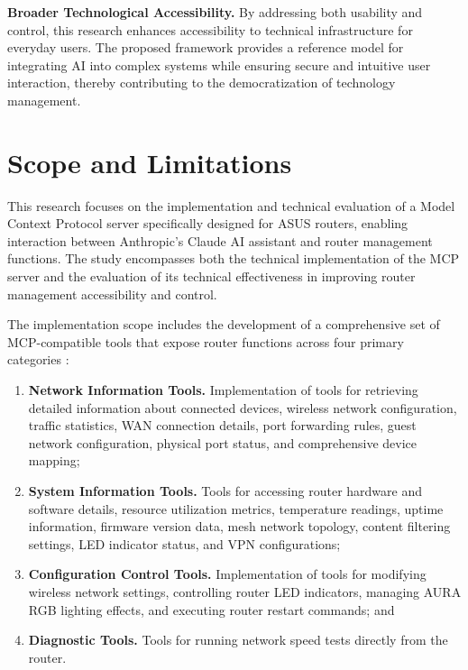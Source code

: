 \textbf{Broader Technological Accessibility.} By addressing both usability and control, this research enhances accessibility to technical infrastructure for everyday users. The proposed framework provides a reference model for integrating AI into complex systems while ensuring secure and intuitive user interaction, thereby contributing to the democratization of technology management.

\section{Scope and Limitations}
This research focuses on the implementation and technical evaluation of a Model Context Protocol server specifically designed for ASUS routers, enabling interaction between Anthropic's Claude AI assistant and router management functions. The study encompasses both the technical implementation of the MCP server and the evaluation of its technical effectiveness in improving router management accessibility and control. 

The implementation scope includes the development of a comprehensive set of MCP-compatible tools that expose router functions across four primary categories \cite{mcp_intro}:

\begin{enumerate}
\item \textbf{Network Information Tools.} Implementation of tools for retrieving detailed information about connected devices, wireless network configuration, traffic statistics, WAN connection details, port forwarding rules, guest network configuration, physical port status, and comprehensive device mapping;

\item \textbf{System Information Tools.} Tools for accessing router hardware and software details, resource utilization metrics, temperature readings, uptime information, firmware version data, mesh network topology, content filtering settings, LED indicator status, and VPN configurations;

\item \textbf{Configuration Control Tools.} Implementation of tools for modifying wireless network settings, controlling router LED indicators, managing AURA RGB lighting effects, and executing router restart commands; and

\item \textbf{Diagnostic Tools.} Tools for running network speed tests directly from the router.
\end{enumerate}

